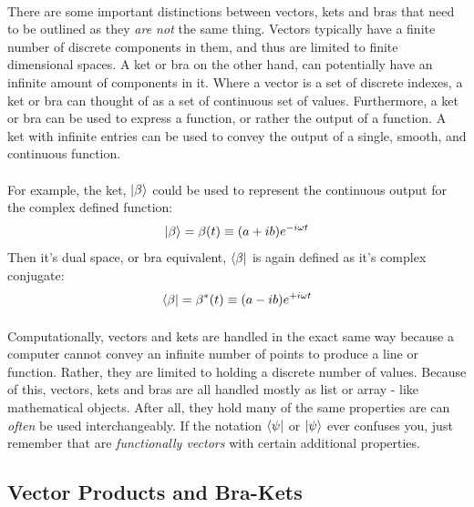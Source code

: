 \documentclass[12pt,letterpaper]{book}
\begin{document}
\paragraph*{}There are some important distinctions between vectors, kets and bras that need to be outlined as they \textit{are not} the same thing. Vectors typically have a finite number of discrete components in them, and thus are limited to finite dimensional spaces. A ket or bra on the other hand, can potentially have an infinite amount of components in it. Where a vector is a set of discrete indexes, a ket or bra can thought of as a set of continuous set of values. Furthermore, a ket or bra can be used to express a function, or rather the output of a function. A ket with infinite entries can be used to convey the output of a single, smooth, and continuous function.
\paragraph*{}For example, the ket, $\ket{\beta}$ could be used to represent the continuous output for the complex defined function:
\begin{equation}
\label{smooth ket}
\ket{\beta} = \beta(t) \equiv (a + ib) e^{-i\omega t}
\end{equation}
Then it's dual space, or bra equivalent, $\bra{\beta}$ is again defined as it's  complex conjugate: 
\begin{equation}
\label{smooth bra}
\bra{\beta} = \beta^*(t) \equiv (a - ib) e^{+i\omega t}
\end{equation}

\paragraph*{}Computationally, vectors and kets are handled in the exact same way because a computer cannot convey an infinite number of points to produce a line or function. Rather, they are limited to holding a discrete number of values. Because of this, vectors, kets and bras are all handled mostly as list or array - like mathematical objects. After all, they hold many of the same properties are can \textit{often} be used interchangeably. If the notation $\bra{\psi}$ or $\ket{\psi}$ ever confuses you, just remember that are \textit{functionally vectors} with certain additional properties.


\subsection*{Vector Products and Bra-Kets}
\end{document}
